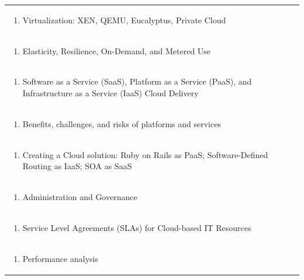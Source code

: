 \documentclass[11pt]{article}
\begin{document}
\begin{center}
\begin{longtable}{|p{4cm}|p{4cm}|p{4cm}|p{4cm}|}
\multicolumn{4}{|p{\dimexpr 16cm + 6\tabcolsep\relax}|}{\begin{enumerate}[start=2]\item Virtualization: XEN, QEMU, Eucalyptus, Private Cloud\end{enumerate}}\\
\multicolumn{4}{|p{\dimexpr 16cm + 6\tabcolsep\relax}|}{\begin{enumerate}[start=3]\item Elasticity, Resilience, On-Demand, and Metered Use\end{enumerate}}\\
\multicolumn{4}{|p{\dimexpr 16cm + 6\tabcolsep\relax}|}{\begin{enumerate}[start=4]\item Software as a Service (SaaS), Platform as a Service (PaaS), and Infrastructure as a Service (IaaS) Cloud Delivery\end{enumerate}}\\
\multicolumn{4}{|p{\dimexpr 16cm + 6\tabcolsep\relax}|}{\begin{enumerate}[start=5]\item Benefits, challenges, and risks of platforms and services\end{enumerate}}\\
\multicolumn{4}{|p{\dimexpr 16cm + 6\tabcolsep\relax}|}{\begin{enumerate}[start=6]\item Creating a Cloud solution: Ruby on Rails as PaaS; Software-Defined Routing as IaaS; SOA as SaaS\end{enumerate}}\\
\multicolumn{4}{|p{\dimexpr 16cm + 6\tabcolsep\relax}|}{\begin{enumerate}[start=7]\item Administration and Governance\end{enumerate}}\\
\multicolumn{4}{|p{\dimexpr 16cm + 6\tabcolsep\relax}|}{\begin{enumerate}[start=8]\item Service Level Agreements (SLAs) for Cloud-based IT Resources\end{enumerate}}\\
\multicolumn{4}{|p{\dimexpr 16cm + 6\tabcolsep\relax}|}{\begin{enumerate}[start=9]\item Performance analysis\end{enumerate}}\\

\end{longtable}
\end{center}
\end{document}
